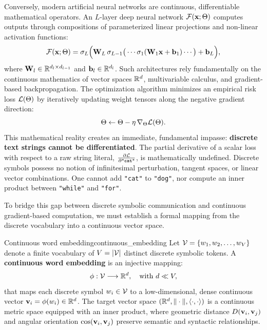\documentclass[../../../main.tex]{subfiles}
\begin{document}
Conversely, modern artificial neural networks are continuous, differentiable mathematical operators. An $L$-layer deep neural network $\mathcal{F}(\mathbf{x}; \Theta)$ computes outputs through compositions of parameterized linear projections and non-linear activation functions:
\begin{equation}
\label{eq:neural_operator}
\mathcal{F}(\mathbf{x}; \Theta) = \sigma_L \Big( \mathbf{W}_L \, \sigma_{L-1}\big( \cdots \sigma_1(\mathbf{W}_1 \mathbf{x} + \mathbf{b}_1) \cdots \big) + \mathbf{b}_L \Big),
\end{equation}
where $\mathbf{W}_l \in \mathbb{R}^{d_l \times d_{l-1}}$ and $\mathbf{b}_l \in \mathbb{R}^{d_l}$. Such architectures rely fundamentally on the continuous mathematics of vector spaces $\mathbb{R}^d$, multivariable calculus, and gradient-based backpropagation. The optimization algorithm minimizes an empirical risk loss $\mathcal{L}(\Theta)$ by iteratively updating weight tensors along the negative gradient direction:
\begin{equation}
\label{eq:gradient_update_rule}
\Theta \leftarrow \Theta - \eta \, \nabla_\Theta \mathcal{L}(\Theta).
\end{equation}
This mathematical reality creates an immediate, fundamental impasse: \textbf{discrete text strings cannot be differentiated}. The partial derivative of a scalar loss with respect to a raw string literal, $\frac{\partial \mathcal{L}}{\partial \text{\texttt{"cat"}}}$, is mathematically undefined. Discrete symbols possess no notion of infinitesimal perturbation, tangent spaces, or linear vector combinations. One cannot add \texttt{"cat"} to \texttt{"dog"}, nor compute an inner product between \texttt{"while"} and \texttt{"for"}.

To bridge this gap between discrete symbolic communication and continuous gradient-based computation, we must establish a formal mapping from the discrete vocabulary into a continuous vector space.

\begin{definition}{Continuous word embedding}{continuous_embedding}
Let $\mathcal{V} = \{w_1, w_2, \dots, w_V\}$ denote a finite vocabulary of $V = |\mathcal{V}|$ distinct discrete symbolic tokens. A \textbf{continuous word embedding} is an injective mapping:
\begin{equation}
\label{eq:embedding_mapping_def}
\phi: \mathcal{V} \longrightarrow \mathbb{R}^d, \quad \text{with } d \ll V,
\end{equation}
that maps each discrete symbol $w_i \in \mathcal{V}$ to a low-dimensional, dense continuous vector $\mathbf{v}_i = \phi(w_i) \in \mathbb{R}^d$. The target vector space $(\mathbb{R}^d, \|\cdot\|, \langle\cdot, \cdot\rangle)$ is a continuous metric space equipped with an inner product, where geometric distance $D(\mathbf{v}_i, \mathbf{v}_j)$ and angular orientation $\cos(\mathbf{v}_i, \mathbf{v}_j)$ preserve semantic and syntactic relationships.
\end{definition}
\end{document}
